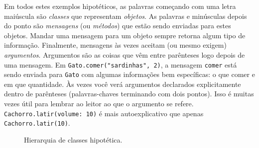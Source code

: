 Em todos estes exemplos hipotéticos, as palavras começando com uma letra maiúscula são \emph{classes} que representam \emph{objetos}. As palavras e minúsculas depois do ponto são \emph{mensagens} (ou \emph{métodos}) que estão sendo enviadas para estes objetos. Mandar uma mensagem para um objeto sempre retorna algum tipo de informação. Finalmente, mensagens às vezes aceitam (ou mesmo exigem) \emph{argumentos}. Argumentos são as coisas que vêm entre parênteses logo depois de uma mensagem. Em \texttt{Gato.comer("sardinhas", 2)}, a mensagem \texttt{comer} está sendo enviada para \texttt{Gato} com algumas informações bem específicas: o que comer e em que quantidade. Às vezes você verá argumentos declarados explicitamente dentro de parênteses (palavras-chaves terminando com dois pontos). Isso é muitas vezes útil para lembrar ao leitor ao que o argumento se refere. \texttt{Cachorro.latir(volume: 10)} é mais autoexplicativo que apenas \texttt{Cachorro.latir(10)}.

\begin{figure}[h]
\centerline{}
\caption{Hierarquia de classes hipotética.}
\label{fig:animal-class-chart}
\end{figure}

